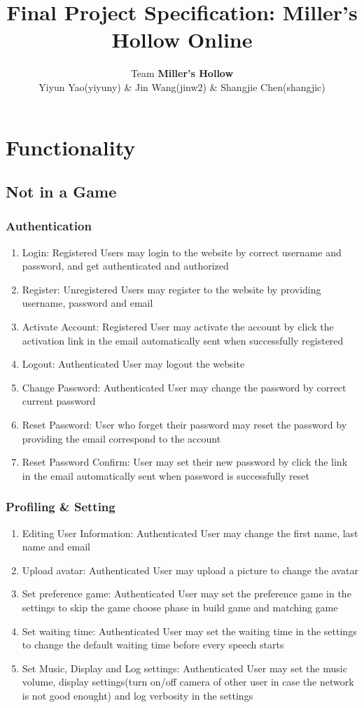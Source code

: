 \documentclass[11pt]{article}
\title{Final Project Specification: Miller's Hollow Online}
\author{Team \textbf{Miller's Hollow}
\\Yiyun Yao(yiyuny) \& Jin Wang(jinw2) \& Shangjie Chen(shangjic)}
\date{}                                           %
\begin{document}
\maketitle

\section{Functionality}
\subsection{Not in a Game}
\subsubsection{Authentication}
\begin{enumerate}
\item
Login: Registered Users may login to the website by correct username and password, and get authenticated and authorized
\item
Register: Unregistered Users may register to the website by providing username, password and email
\item
Activate Account: Registered User may activate the account by click the activation link in the email automatically sent when successfully registered
\item
Logout: Authenticated User may logout the website
\item
Change Password: Authenticated User may change the password by correct current password
\item
Reset Password: User who forget their password may reset the password by providing the email correspond to the account
\item
Reset Password Confirm: User may set their new password by click the link in the email automatically sent when password is successfully reset
\end{enumerate}

\subsubsection{Profiling \& Setting}
\begin{enumerate}
\item
Editing User Information: Authenticated User may change the first name, last name and email
\item
Upload avatar: Authenticated User may upload a picture to change the avatar
\item
Set preference game: Authenticated User may set the preference game in the settings to skip the game choose phase in build game and matching game
\item
Set waiting time: Authenticated User may set the waiting time in the settings to change the default waiting time before every speech starts
\item
Set Music, Display and Log settings: Authenticated User may set the music volume, display settings(turn on/off camera of other user in case the network is not good enought) and log verbosity in the settings
\end{enumerate}
\end{document}
